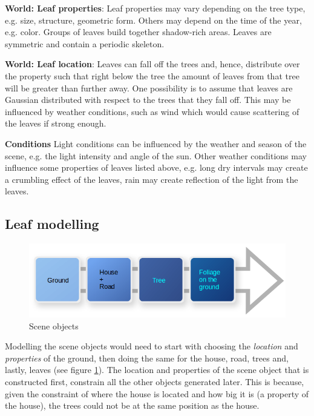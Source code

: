 \documentclass[fleqn,10pt]{SelfArx} %
\begin{document}
\textbf{World: Leaf properties}: Leaf properties may vary depending on the tree type, e.g. size, structure, geometric form. Others may depend on the time of the year, e.g. color. Groups of leaves build together shadow-rich areas. Leaves are symmetric and contain a periodic skeleton.

\textbf{World: Leaf location}: Leaves can fall off the trees and, hence, distribute over the property such that right below the tree the amount of leaves from that tree will be greater than further away. One possibility is to assume that leaves are Gaussian distributed with respect to the trees that they fall off. This may be influenced by weather conditions, such as wind which would cause scattering of the leaves if strong enough.

\textbf{Conditions} Light conditions can be influenced by the weather and season of the scene, e.g. the light intensity and angle of the sun. Other weather conditions may influence some properties of leaves listed above, e.g. long dry intervals may create a crumbling effect of the leaves, rain may create reflection of the light from the leaves.

\subsection{Leaf modelling}

\begin{figure}[ht]\centering
\includegraphics[width=\linewidth]{Figures/sceneObj.png}
\caption{Scene objects}
\label{fig:sceneObj}
\end{figure}

Modelling the scene objects would need to start with choosing the \emph{location} and \emph{properties} of the ground, then doing the same for the house, road, trees and, lastly, leaves (see figure \ref{fig:sceneObj}). The location and properties of the scene object that is constructed first, constrain all the other objects generated later. This is because, given the constraint of where the house is located and how big it is (a property of the house), the trees could not be at the same position as the house.
\end{document}
